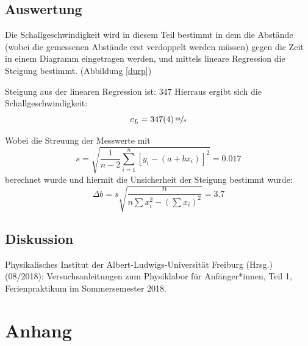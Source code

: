 \documentclass[11pt,a4paper]{article}
\begin{document}
\subsection{Auswertung}

Die Schallgeschwindigkeit wird in diesem Teil bestimmt in dem die Abstände (wobei die gemessenen Abstände erst verdoppelt werden müssen) gegen die Zeit in einem Diagramm eingetragen werden, und mittels lineare Regression die Steigung bestimmt. (Abbildung \ref{durp}) 

Steigung aus der linearen Regression ist: $347$
Hierraus ergibt sich die Schallgeschwindigkeit:
$$c_L = 347(4)\,\nicefrac{\textrm{m}}{\textrm{s}}$$

Wobei die Streuung der Messwerte mit
$$s =\sqrt{\frac{1}{n-2}\sum^n_{i=1}[y_i-(a+bx_i)]^2} = 0.017$$
berechnet wurde und hiermit die Unsicherheit der Steigung bestimmt wurde:
$$\Delta b=s\sqrt{\frac{n}{n\sum x_i^2-(\sum x_i)^2}} = 3.7$$

\subsection{Diskussion}


\vfill

\begin{thebibliography}{9}
	 Physikalisches Institut der Albert-Ludwigs-Universität Freiburg (Hrsg.) (08/2018): Versuchsanleitungen zum Physiklabor für Anfänger*innen, Teil 1, Ferienpraktikum im Sommersemester 2018.
\end{thebibliography}

\pagebreak

\section{Anhang}
\end{document}
